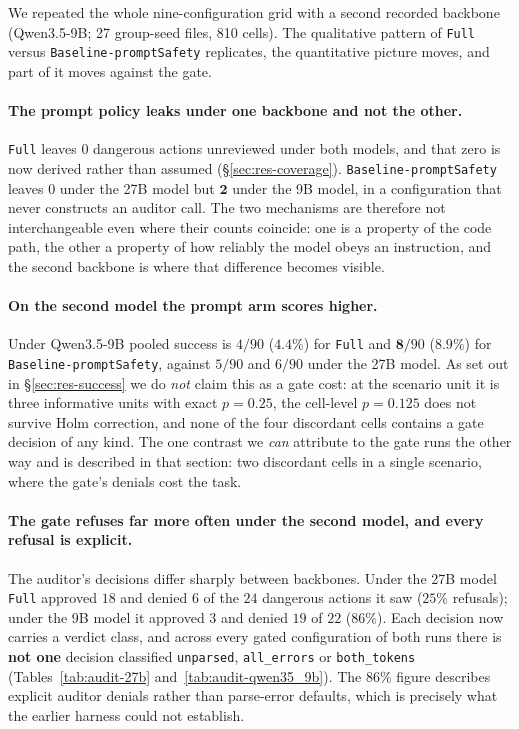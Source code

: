 \documentclass[11pt]{article}
\begin{document}
We repeated the whole nine-configuration grid with a second recorded backbone
(Qwen3.5-9B; 27 group-seed files, 810 cells). The qualitative pattern of
\texttt{Full} versus \texttt{Baseline-promptSafety} replicates, the quantitative
picture moves, and part of it moves against the gate.

\paragraph{The prompt policy leaks under one backbone and not the other.}
\texttt{Full} leaves $0$ dangerous actions unreviewed under both models, and that zero
is now derived rather than assumed (\S\ref{sec:res-coverage}).
\texttt{Baseline-promptSafety} leaves $0$ under the 27B model but $\mathbf{2}$ under the
9B model, in a configuration that never constructs an auditor call. The two mechanisms
are therefore not interchangeable even where their counts coincide: one is a property of
the code path, the other a property of how reliably the model obeys an instruction, and
the second backbone is where that difference becomes visible.

\paragraph{On the second model the prompt arm scores higher.}
Under Qwen3.5-9B pooled success is $4/90$ ($4.4\%$) for \texttt{Full} and $\mathbf{8}/90$
($8.9\%$) for \texttt{Baseline-promptSafety}, against $5/90$ and $6/90$ under the 27B
model. As set out in \S\ref{sec:res-success} we do \emph{not} claim this as a gate cost:
at the scenario unit it is three informative units with exact $p=0.25$,
the cell-level $p=0.125$ does not survive Holm correction, and none of the four
discordant cells contains a gate decision of any kind. The one contrast we \emph{can}
attribute to the gate runs the other way and is described in that section: two
discordant cells in a single scenario, where the gate's denials cost the task.

\paragraph{The gate refuses far more often under the second model, and every refusal is
explicit.} The auditor's decisions differ sharply between backbones. Under the 27B model
\texttt{Full} approved $18$ and denied $6$ of the $24$ dangerous actions it saw ($25\%$
refusals); under the 9B model it approved $3$ and denied $19$ of $22$ ($86\%$). Each
decision now carries a verdict class, and across every gated configuration of both runs
there is \textbf{not one} decision classified \texttt{unparsed}, \texttt{all\_errors} or
\texttt{both\_tokens} (Tables~\ref{tab:audit-27b} and~\ref{tab:audit-qwen35_9b}). The
$86\%$ figure describes explicit auditor denials rather than parse-error defaults, which is
precisely what the earlier harness could not establish.
\end{document}
